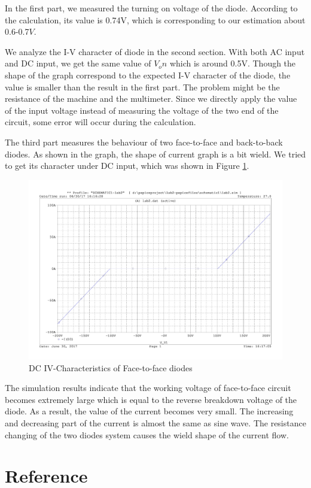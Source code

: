 \documentclass{article}
\begin{document}
In the first part, we measured the turning on voltage of the diode. According to the calculation, its value is 0.74V, which is corresponding to our estimation about 0.6-0.7$V$.


We analyze the I-V character of diode in the second section. With both AC input and DC input, we get the same value of $V_on$ which is around 0.5V. Though the shape of the graph correspond to the expected I-V character of the diode, the value is smaller than the result in the first part. The problem might be the resistance of the machine and the multimeter. Since we directly apply the value of the input voltage instead of measuring the voltage of the two end of the circuit, some error will occur during the calculation.

The third part measures the behaviour of two face-to-face and back-to-back diodes. As shown in the graph, the shape of current graph is a bit wield. We tried to get its character under DC input, which was shown in Figure \ref{fig-conclusion}.

\begin{figure}[!htbp]
	\centering
	\includegraphics[width=0.7\linewidth]{imgs/conclusion.png}
	\caption{DC IV-Characteristics of Face-to-face diodes}
	\label{fig-conclusion}
\end{figure}

The simulation results indicate that the working voltage of face-to-face circuit becomes extremely large which is equal to the reverse breakdown voltage of the diode. As a result, the value of the current becomes very small. The increasing and decreasing part of the current is almost the same as sine wave. The resistance changing of the two diodes system causes the wield shape of the current flow. 



\newpage

\section{Reference}
\end{document}
